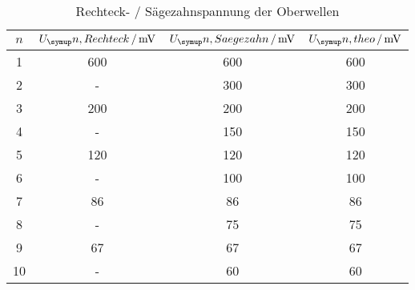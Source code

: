 \begin{table}
  \centering
  \begin{tabular}{c c c c}
    \toprule
    $n$ & $U_\su{n, Rechteck}\,/\,\si{\milli\volt}$ & $U_\su{n, Saegezahn}\,/\,\si{\milli\volt}$ &
     $U_\su{n, theo}\,/\,\si{\milli\volt}$ \\
    \midrule
    1 & 600   &  600  &  600  \\
    2 & -     &  300  &  300  \\
    3 & 200   &  200  &  200  \\
    4 & -     &  150  &  150  \\
    5 & 120   &  120  &  120  \\
    6 & -     &  100  &  100  \\
    7 &  86   &  86   &  86   \\
    8 & -     &  75   &  75   \\
    9 &  67   &  67   &  67   \\
   10 &  -    &  60   &  60   \\
    \bottomrule
  \end{tabular}
  \caption{Rechteck- / Sägezahnspannung der Oberwellen}
  \label{tab:rechtsäge}
\end{table}
